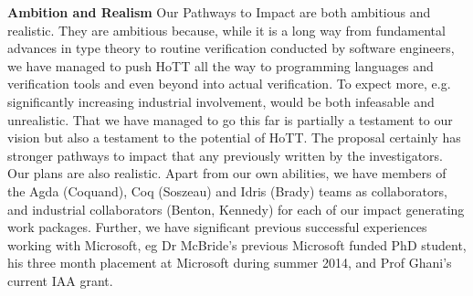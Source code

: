 \documentclass[a4paper,11pt]{article}
\begin{document}
{\bf Ambition and Realism} Our Pathways to Impact
are both ambitious and realistic. They are ambitious because, while it
is a long way from fundamental advances in type theory to routine
verification conducted by software engineers, we have managed to push
HoTT all the way to programming languages and verification tools and
even beyond into actual verification. To expect more,
e.g. significantly increasing industrial involvement, would be both
infeasable and unrealistic. That we have managed to go this far is
partially a testament to our vision but also a testament to the
potential of HoTT. The proposal certainly has stronger pathways to
impact that any previously written by the investigators. Our plans are
also realistic. Apart from our own abilities, we have members of the
Agda (Coquand), Coq (Soszeau) and Idris (Brady) teams as
collaborators, and industrial collaborators (Benton, Kennedy) for each
of our impact generating work packages. Further, we have significant
previous successful experiences working with Microsoft, eg Dr McBride's
previous Microsoft funded PhD student, his three month placement at Microsoft
during
summer 2014, and Prof Ghani's current IAA grant.



\end{document}
